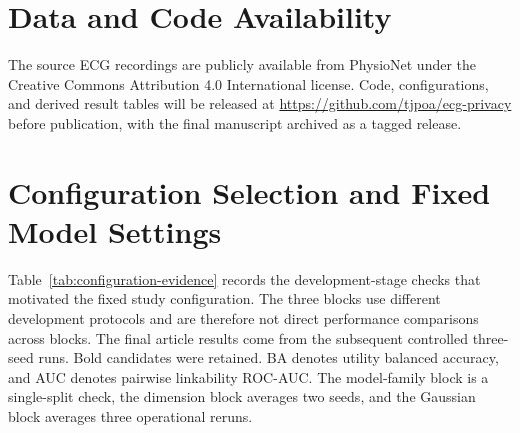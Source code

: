 \documentclass[journal]{IEEEtran}
\begin{document}
\section*{Data and Code Availability}
The source ECG recordings are publicly available from PhysioNet under the
Creative Commons Attribution 4.0 International license. Code, configurations,
and derived result tables will be released at
\url{https://github.com/tjpoa/ecg-privacy} before publication, with the final
manuscript archived as a tagged release.

\newif\ifincludeappendices
\includeappendicesfalse
\ifincludeappendices
\appendices

\section{Configuration Selection and Fixed Model Settings}
\label{app:configuration}

Table~\ref{tab:configuration-evidence} records the development-stage checks
that motivated the fixed study configuration. The three blocks use different
development protocols and are therefore not direct performance comparisons
across blocks. The final article results come from the subsequent controlled
three-seed runs. Bold candidates were retained. BA denotes utility balanced
accuracy, and AUC denotes pairwise linkability ROC-AUC. The model-family block
is a single-split check, the dimension block averages two seeds, and the
Gaussian block averages three operational reruns.
\end{document}
